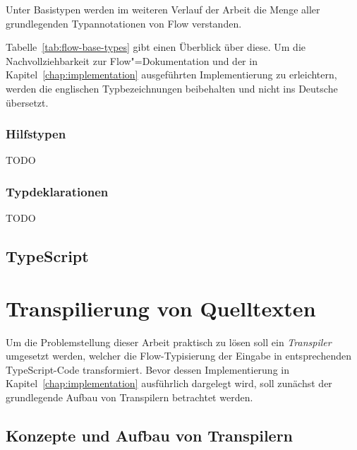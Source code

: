 Unter Basistypen werden im weiteren Verlauf der Arbeit die Menge aller grundlegenden Typannotationen von Flow verstanden.


Tabelle~\ref{tab:flow-base-types} gibt einen Überblick über diese. Um die Nachvollziehbarkeit zur Flow"=Dokumentation und der in Kapitel~\ref{chap:implementation} ausgeführten Implementierung zu erleichtern, werden die englischen Typbezeichnungen beibehalten und nicht ins Deutsche übersetzt.

\bigbreak


\subsubsection{Hilfstypen}
\label{subsec:flow:utility-types}

TODO

\bigbreak


\subsubsection{Typdeklarationen}
\label{subsubsec:type-declarations}

TODO

\bigbreak


\subsection{TypeScript}

\section{Transpilierung von Quelltexten}
\label{sec:transpilers}

Um die Problemstellung dieser Arbeit praktisch zu lösen soll ein \textit{Transpiler} umgesetzt werden, welcher die Flow-Typisierung der Eingabe in entsprechenden TypeScript-Code transformiert. Bevor dessen Implementierung in Kapitel~\ref{chap:implementation} ausführlich dargelegt wird, soll zunächst der grundlegende Aufbau von Transpilern betrachtet werden.

\subsection{Konzepte und Aufbau von Transpilern}

